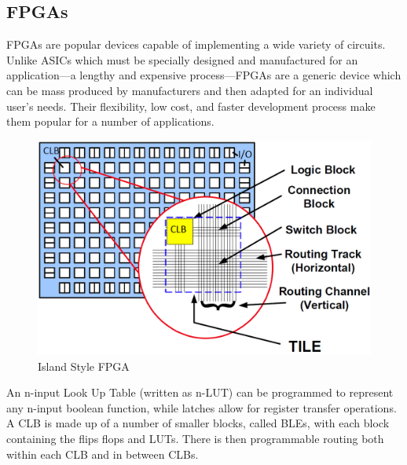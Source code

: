 \documentclass[12pt,drafta4paper,oneside]{memoir} %
\begin{document}
\subsection{\acp{FPGA}}
\acp{FPGA} are popular devices capable of implementing a wide variety of circuits. Unlike \acp{ASIC} which must be specially designed and manufactured for an application---a lengthy and expensive process---\acp{FPGA} are a generic device which can be mass produced by manufacturers and then adapted for an individual user's needs. Their flexibility, low cost, and faster development process make them popular for a number of applications.


\begin{figure}
    \includegraphics[width=\textwidth]{images/fpga-arch.png}
    \caption{Island Style FPGA\cite{WiltonLecture}}
    \label{FPGAArch}
\end{figure}
An n-input Look Up Table (written as n-LUT) can be programmed to represent any n-input boolean function, while latches allow for register transfer operations. A \ac{CLB} is made up of a number of smaller blocks, called \acp{BLE}, with each block containing the flips flops and \acp{LUT}. There is then programmable routing both within each \ac{CLB} and in between \acp{CLB}.
\end{document}
